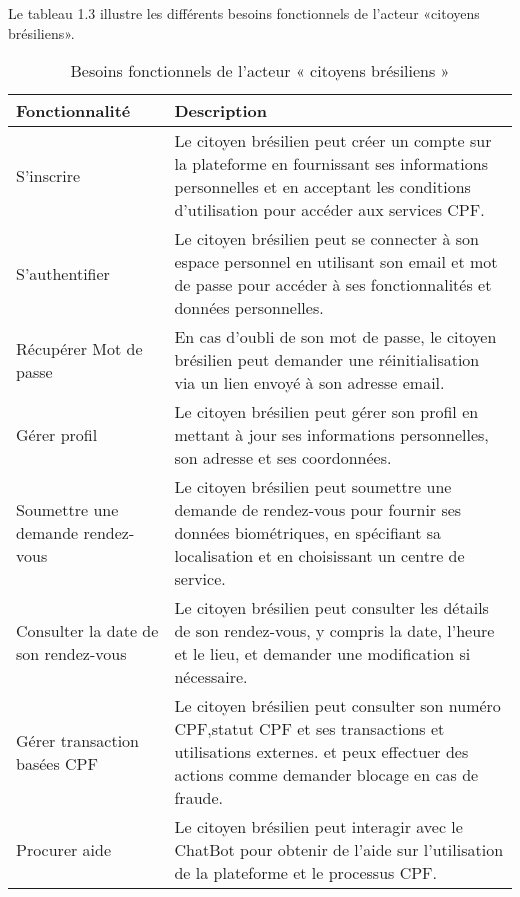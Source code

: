 Le tableau 1.3 illustre les différents besoins fonctionnels de l'acteur «citoyens brésiliens».
\begin{longtable}
{| >{\centering\arraybackslash}p{4.2cm} | >{\arraybackslash}p{12.5cm} |}
\caption{\centering Besoins fonctionnels de l'acteur « citoyens brésiliens »} \label{tab:besoins-citoyens} \\
\hline
\rowcolor{gray!30} \textbf{Fonctionnalité} & \textbf{Description} \\
\hline
\endfirsthead

\endhead

\hline
\endfoot

\hline
\endlastfoot

S'inscrire & Le citoyen brésilien peut créer un compte sur la plateforme en fournissant ses informations personnelles et en acceptant les conditions d'utilisation pour accéder aux services CPF. \\
\hline
S'authentifier & Le citoyen brésilien peut se connecter à son espace personnel en utilisant son email et mot de passe pour accéder à ses fonctionnalités et données personnelles. \\
\hline
Récupérer Mot de passe & En cas d'oubli de son mot de passe, le citoyen brésilien peut demander une réinitialisation via un lien envoyé à son adresse email. \\
\hline
Gérer profil & Le citoyen brésilien peut gérer son profil en mettant à jour ses informations personnelles, son adresse et ses coordonnées. \\
\hline
Soumettre une demande rendez-vous & Le citoyen brésilien peut soumettre une demande de rendez-vous pour fournir ses données biométriques, en spécifiant sa localisation et en choisissant un centre de service. \\
\hline
Consulter la date de son rendez-vous & Le citoyen brésilien peut consulter les détails de son rendez-vous, y compris la date, l'heure et le lieu, et demander une modification si nécessaire. \\
\hline
Gérer transaction basées CPF & Le citoyen brésilien peut consulter son numéro CPF,statut CPF et ses transactions et utilisations externes. et peux effectuer des actions comme demander blocage en cas de fraude. \\
\hline
Procurer aide & Le citoyen brésilien peut interagir avec le ChatBot pour obtenir de l'aide sur l'utilisation de la plateforme et le processus CPF. \\
\hline

\end{longtable}



